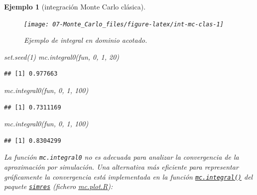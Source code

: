 \documentclass[
]{book}
\newenvironment{Shaded}{\begin{snugshade}}{\end{snugshade}}
\newcommand{\DecValTok}[1]{\textcolor[rgb]{0.00,0.00,0.81}{#1}}
\newcommand{\FunctionTok}[1]{\textcolor[rgb]{0.00,0.00,0.00}{#1}}
\newcommand{\NormalTok}[1]{#1}
\theoremstyle{break}
\newtheorem{example}{Ejemplo}[chapter]
\theoremstyle{nonumberplain}
\begin{document}
\begin{example}[integración Monte Carlo clásica]
\begin{figure}[!htb]

{\centering \texttt{[image: 07-Monte\_Carlo\_files/figure-latex/int-mc-clas-1]} 

}

\caption{Ejemplo de integral en dominio acotado.}\label{fig:int-mc-clas}
\end{figure}

\begin{Shaded}
\begin{Highlighting}[]
\FunctionTok{set.seed}\NormalTok{(}\DecValTok{1}\NormalTok{)}
\FunctionTok{mc.integral0}\NormalTok{(fun, }\DecValTok{0}\NormalTok{, }\DecValTok{1}\NormalTok{, }\DecValTok{20}\NormalTok{)}
\end{Highlighting}
\end{Shaded}

\begin{verbatim}
## [1] 0.977663
\end{verbatim}

\begin{Shaded}
\begin{Highlighting}[]
\FunctionTok{mc.integral0}\NormalTok{(fun, }\DecValTok{0}\NormalTok{, }\DecValTok{1}\NormalTok{, }\DecValTok{100}\NormalTok{)}
\end{Highlighting}
\end{Shaded}

\begin{verbatim}
## [1] 0.7311169
\end{verbatim}

\begin{Shaded}
\begin{Highlighting}[]
\FunctionTok{mc.integral0}\NormalTok{(fun, }\DecValTok{0}\NormalTok{, }\DecValTok{1}\NormalTok{, }\DecValTok{100}\NormalTok{)}
\end{Highlighting}
\end{Shaded}

\begin{verbatim}
## [1] 0.8304299
\end{verbatim}

La función \texttt{mc.integral0} no es adecuada para analizar la convergencia de la aproximación por simulación.
Una alternativa más eficiente para representar gráficamente la convergencia está implementada en la función \href{https://rubenfcasal.github.io/simres/reference/mc.integral.html}{\texttt{mc.integral()}} del paquete \href{https://rubenfcasal.github.io/simres}{\texttt{simres}} (fichero \href{R/mc.plot.R}{\emph{mc.plot.R}}):


\end{example}
\end{document}
